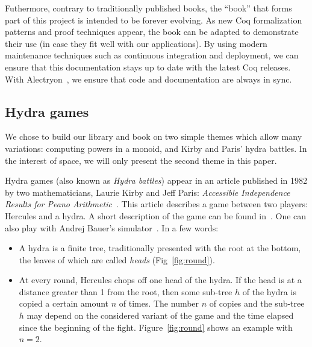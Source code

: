 \documentclass{easychair}
\newcommand{\coq}{Coq\xspace}
\newcommand{\alectr}{Alectryon\xspace}
\begin{document}
Futhermore, contrary to traditionally published books, the ``book'' that forms part of this project is intended to be forever evolving. As new \coq formalization patterns and proof techniques appear, the book can be adapted to demonstrate their use (in case they fit well with our applications).
%
By using modern maintenance techniques such as continuous integration and deployment, we can ensure that this documentation stays up to date with the latest \coq releases. With \alectr~\cite{alectryonpaper, alectryongithub}, we ensure that code and documentation are always in sync.

\subsection{Hydra games}

We chose to build our library and book on two simple themes which allow many variations: computing powers in a monoid, and Kirby and Paris' hydra battles. In the interest of space, we will only present the second theme in this paper.


Hydra games (also known as \emph{Hydra battles}) appear in an article published in 1982 by two mathematicians, 
Laurie Kirby and Jeff Paris: \emph{Accessible Independence Results for Peano Arithmetic}~\cite{KP82}.
This article describes a game between two players: Hercules and a hydra.
A short description of the game  can be found in~\cite{bauer2008, KP82, JFLA2018paper}. One can also play with
Andrej Bauer's simulator~\cite{BauerHydra}.
In a few words:
\begin{itemize}
\item A hydra is a finite tree, traditionally presented with the root at the bottom, the leaves of which are called \emph{heads}
  (Fig~\ref{fig:round}).
\item At every round, Hercules chops off one head of the hydra. If the head is at a distance greater than 1 from the root,
  then some sub-tree $h$ of the hydra is copied a certain amount $n$ of times. The number $n$ of copies and the sub-tree $h$ may depend on the considered variant of the game
  and the time elapsed since the beginning of the fight.
  Figure~\ref{fig:round} shows an example with $n=2$.
\end{itemize}
\end{document}
